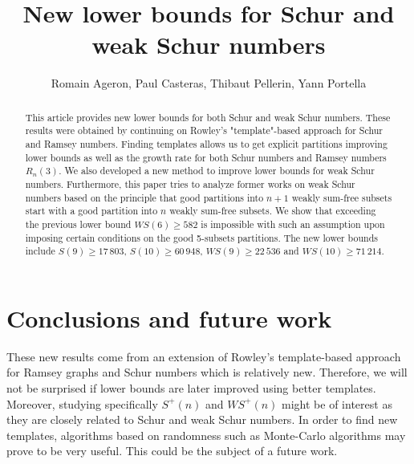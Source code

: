 \documentclass{article}
\title{New lower bounds for Schur and weak Schur numbers}
\author{Romain Ageron, Paul Casteras, Thibaut Pellerin, Yann Portella}
\newtheorem{computational theorem}[definition]{Computational Theorem}
\newcommand{\WS}{\mathit{WS}}
\begin{document}
\maketitle

\begin{abstract}

This article provides new lower bounds for both Schur and weak Schur numbers. These results were obtained by 
continuing on Rowley's "template"-based approach for Schur and Ramsey numbers. Finding templates allows us to 
get explicit partitions improving lower bounds as well as the growth rate for both Schur numbers and Ramsey 
numbers \(R_n(3)\). We also developed a new method to improve lower bounds for weak Schur numbers. 
Furthermore, this paper tries to analyze former works on weak Schur numbers based on the principle that good 
partitions into \(n+1\) weakly sum-free subsets start with a good partition into \(n\) weakly sum-free subsets. 
We show that exceeding the previous lower bound \(\WS (6) \geqslant 582\) is impossible with such an assumption 
upon imposing certain conditions on the good 5-subsets partitions. The new lower bounds include 
\(S(9) \geqslant 17\,803\), \(S(10) \geqslant 60\,948\), \(\WS (9) \geqslant 22\,536\) and 
\(\WS (10) \geqslant 71\,214 \).

\end{abstract}











\section{Conclusions and future work}

\qquad These new results come from an extension of Rowley's template-based approach for Ramsey graphs and 
Schur numbers which is relatively new. Therefore, we will not be surprised if lower bounds are later improved 
using better templates. Moreover, studying specifically \(S^+(n)\) and \(\WS^+(n)\) might be of interest as they
 are closely related to Schur and weak Schur numbers. In order to find new templates, algorithms based on 
randomness such as Monte-Carlo algorithms may prove to be very useful. This could be the subject of a future work.
\end{document}
